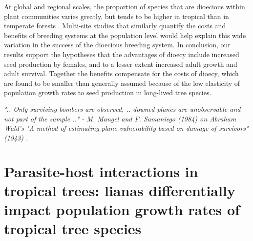 \documentclass[b5paper,justified]{tufte-book} %
\begin{document}
\begin{fullwidth}
At global and regional scales, the proportion of species that are dioecious within plant communities varies greatly, but tends to be higher in tropical than in temperate forests \citep{Vamosi2010}. Multi-site studies that similarly quantify the costs and benefits of breeding systems at the population level would help explain this wide variation in the success of the dioecious breeding system. In conclusion, our results support the hypotheses that the advantages of dioecy include increased seed production by females, and to a lesser extent increased adult growth and adult survival. Together the benefits compensate for the costs of dioecy, which are found to be smaller than generally assumed because of the low elasticity of population growth rates to seed production in long-lived tree species. 

\end{fullwidth} 

\begin{landscape}
\begin{figure*}
\vspace*{-.6cm}\hspace*{4.4cm}

\hspace*{5cm}\begin{minipage}{18cm}
 \textit{\footnotesize ".. Only surviving bombers are observed, .. downed planes are unobservable and not part of the sample .." - M. Mangel and F. Samaniego (1984) on Abraham \vspace*{-0.4cm} Wald's "A method of estimating plane vulnerability based on damage of survivors" (1943) \nocite{Mangel1984}.}

\end{minipage}
\end{figure*}
\end{landscape}

\let\cleardoublepage\clearpage

\chapter{Parasite-host interactions in tropical trees: lianas differentially impact population growth rates of tropical tree species}
\label{ch7} 
\end{document}
